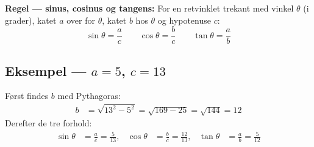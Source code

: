 \begin{regelbox}
\textbf{Regel --- sinus, cosinus og tangens:} For en retvinklet trekant
med vinkel $\theta$ (i grader), katet $a$ over for $\theta$, katet $b$
hos $\theta$ og hypotenuse $c$:
\begin{equation*}
\sin\theta=\frac{a}{c}\qquad\cos\theta=\frac{b}{c}\qquad\tan\theta=\frac{a}{b}
\end{equation*}
\end{regelbox}

\subsection*{Eksempel --- $a=5$, $c=13$}

\noindent
Først findes $b$ med Pythagoras:
\begin{align*}
  b &= \sqrt{13^{2}-5^{2}} = \sqrt{169-25} = \sqrt{144} = 12
\end{align*}
Derefter de tre forhold:
\begin{align*}
  \sin\theta &= \frac{a}{c} = \frac{5}{13}, &
  \cos\theta &= \frac{b}{c} = \frac{12}{13}, &
  \tan\theta &= \frac{a}{b} = \frac{5}{12}
\end{align*}
